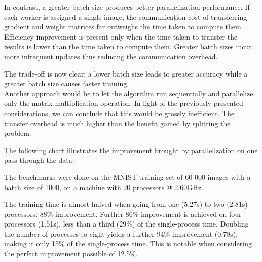 \documentclass[a4paper]{article}
\begin{document}
In contrast, a greater batch size produces better parallelization performance. If each worker is assigned a single image, the communication cost of transferring gradient and weight matrices far outweighs the time taken to compute them. Efficiency improvement is present only when the time taken to transfer the results is lower than the time taken to compute them. Greater batch sizes incur more infrequent updates thus reducing the communication overhead.

The trade-off is now clear: a lower batch size leads to greater accuracy while a greater batch size causes faster training.
\\

Another approach would be to let the algorithm run sequentially and parallelize only the matrix multiplication operation. In light of the previously presented considerations, we can conclude that this would be grossly inefficient. The transfer overhead is much higher than the benefit gained by splitting the problem.

The following chart illustrates the improvement brought by parallelization on one pass through the data:

\begin{center}
\end{center}

\noindent The benchmarks were done on the MNIST training set of 60 000 images with a batch size of 1000, on a machine with 20 processors @ 2.60GHz.

The training time is almost halved when going from one (5.27s) to two (2.81s) processors: 88\% improvement. Further 86\% improvement is achieved on four processors (1.51s), less than a third (29\%) of the single-process time. Doubling the number of processes to eight yields a further 94\% improvement (0.78s), making it only 15\% of the single-process time. This is notable when considering the perfect improvement possible of 12.5\%. 
\end{document}
